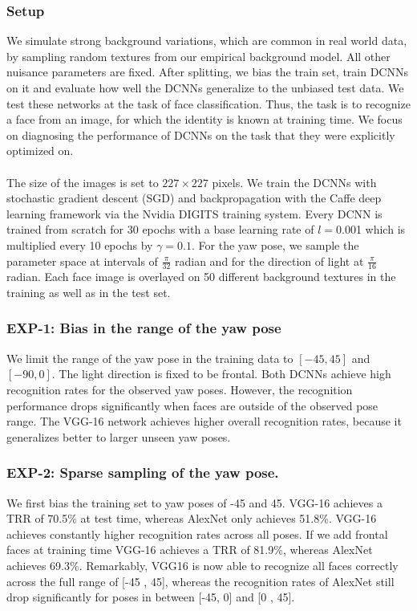 \documentclass[12pt]{article}
\begin{document}
\subsubsection{Setup}
We simulate strong background variations,
which are common in real world data, by sampling random
textures from our empirical background model. All other
nuisance parameters are fixed. After splitting, we bias the train set, train DCNNs on it and evaluate
how well the DCNNs generalize to the unbiased test data. We test these networks at the task of face classification. Thus, the task is to recognize a face from an image,
for which the identity is known at training time. We focus on diagnosing the performance of
DCNNs on the task that they were explicitly optimized on.\\
\\
The size of the images is set to
$227 \times 227$ pixels. We train the DCNNs with stochastic gradient descent (SGD) and backpropagation with the Caffe
deep learning framework via the Nvidia DIGITS training system. Every DCNN is trained from scratch for 30
epochs with a base learning rate of $l = 0$.001 which is multiplied every 10 epochs by $\gamma = 0.1$. For the yaw pose, we sample the parameter space at intervals of $\tfrac{\pi}
{32}$ radian and for the direction
of light at $\tfrac{\pi}
{16}$ radian. Each face image is overlayed on 50
different background textures in the training as well as in
the test set.
\subsubsection{EXP-1: Bias in the range of the yaw pose}
We limit the range of the yaw pose in
the training data to $\left[-45,45\right]$ and $\left[-90,0\right]$. The light direction is fixed to be frontal. Both DCNNs achieve high recognition rates for the observed yaw
poses. However, the recognition performance drops significantly when faces are outside of the observed pose range. The VGG-16
network achieves higher overall recognition rates, because
it generalizes better to larger unseen yaw poses.
\subsubsection{EXP-2: Sparse sampling of the yaw pose.}
We first bias
the training set to yaw poses of -45
and 45. VGG-16 achieves a TRR of 70.5\% at test time, whereas AlexNet
only achieves 51.8\%. VGG-16 achieves
constantly higher recognition rates across all poses. If we add frontal faces at training time VGG-16 achieves a TRR of 81.9\%,
whereas AlexNet achieves 69.3\%. Remarkably, VGG16 is now able to recognize all faces correctly across the
full range of [-45
, 45], whereas the recognition rates
of AlexNet still drop significantly for poses in between
[-45, 0] and [0
, 45].
\end{document}
